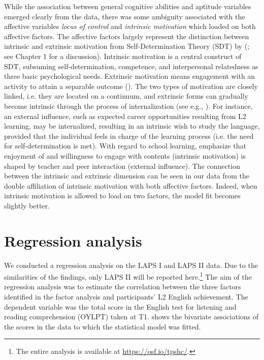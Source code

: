 \documentclass[output=paper]{langsci/langscibook}
\begin{document}
While the association between general cognitive abilities and aptitude variables emerged clearly from the data, there was some ambiguity associated with the affective variables \textit{locus of control} and \textit{intrinsic motivation} which loaded on both affective factors. The affective factors largely represent the distinction between intrinsic and extrinsic motivation from Self-Determination Theory (SDT) by \citeauthor{DeciRyan1985} (\citeyear{DeciRyan1985, DeciRyan2002}; see Chapter 1 for a discussion). Intrinsic motivation is a central construct of SDT, subsuming self-determination, competence, and interpersonal relatedness as three basic psychological needs. Extrinsic motivation means engagement with an activity to attain a separable outcome (\citealt[60]{DeciRyan2000}). The two types of motivation are closely linked, i.e. they are located on a continuum, and extrinsic forms can gradually become intrinsic through the process of internalization (see e.g., \citealt{DeciRyan1985}). For instance, an external influence, such as expected career opportunities resulting from L2 learning, may be internalized, resulting in an intrinsic wish to study the language, provided that the individual feels in charge of the learning process (i.e. the need for self-determination is met). With regard to school learning,  \citet[64]{DeciRyan2000} emphasize that enjoyment of and willingness to engage with contents (intrinsic motivation) is shaped by teacher and peer interaction (external influence). The connection between the intrinsic and extrinsic dimension can be seen in our data from the double affiliation of intrinsic motivation with both affective factors. Indeed, when intrinsic motivation is allowed to load on two factors, the model fit becomes slightly better.

\section{Regression analysis}

We conducted a regression analysis on the LAPS I and LAPS II data. Due to the similarities of the findings, only LAPS II will be reported here.\footnote{The entire analysis is available at \url{https://osf.io/tpshc/}.} The aim of the regression analysis was to estimate the correlation between the three factors identified in the factor analysis and participants’ L2 English achievement. The dependent variable was the total score in the English test for listening and reading comprehension (OYLPT) taken at T1.  shows the bivariate associations of the scores in the data to which the statistical model was fitted.
\end{document}
